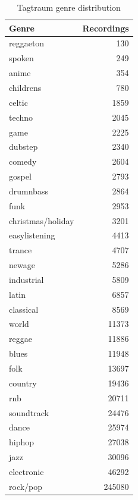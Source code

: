 \begin{table}[!ht]
    \centering
    \begin{tabular}{l r} 
        \hline
        Genre & Recordings \\ [0.5ex] 
        \hline
        reggaeton & 130 \\
        spoken & 249 \\
        anime & 354 \\
        childrens & 780 \\
        celtic & 1859 \\
        techno & 2045 \\
        game & 2225 \\
        dubstep & 2340 \\
        comedy & 2604 \\
        gospel & 2793 \\
        drumnbass & 2864 \\
        funk & 2953 \\
        christmas/holiday & 3201 \\
        easylistening & 4413 \\
        trance & 4707 \\
        newage & 5286 \\
        industrial & 5809 \\
        latin & 6857 \\
        classical & 8569 \\
        world & 11373 \\
        reggae & 11886 \\
        blues & 11948 \\
        folk & 13697 \\
        country & 19436 \\
        rnb & 20711 \\
        soundtrack & 24476 \\
        dance & 25974 \\
        hiphop & 27038 \\
        jazz & 30096 \\
        electronic & 46292 \\
        rock/pop & 245080 \\
        \hline
    \end{tabular}
    \caption{Tagtraum genre distribution}
    \label{table:tagtraumdist}
\end{table}



